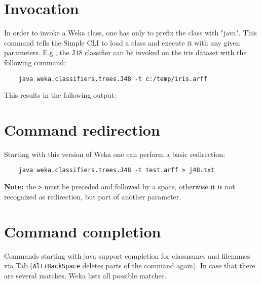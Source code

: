 \section{Invocation}
In order to invoke a Weka class, one has only to prefix the class with "java". This command tells the Simple CLI to load a class and execute it with any given parameters. E.g., the J48 classifier can be invoked on the iris dataset with the following command:
\begin{verbatim}
	java weka.classifiers.trees.J48 -t c:/temp/iris.arff
\end{verbatim}

This results in the following output: 
\begin{center}
\end{center}


\section{Command redirection}
Starting with this version of Weka one can perform a basic redirection:

\begin{verbatim}
	java weka.classifiers.trees.J48 -t test.arff > j48.txt
\end{verbatim}

\noindent \textbf{Note:} the \texttt{>} must be preceded and followed by a space, otherwise it is not recognized as redirection, but part of another parameter.

\section{Command completion}
Commands starting with java support completion for classnames and filenames via Tab (\texttt{Alt+BackSpace} deletes parts of the command again). In case that there are several matches, Weka lists all possible matches.


